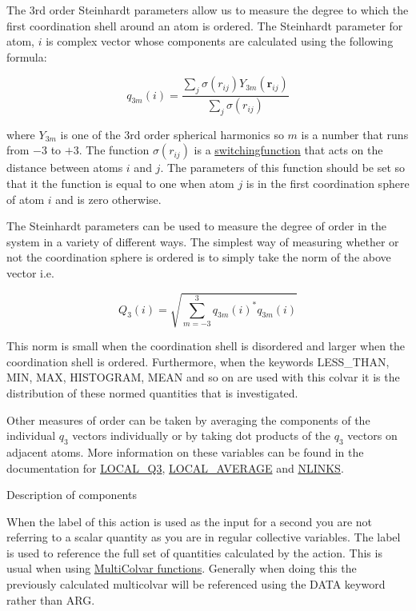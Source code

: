 The 3rd order Steinhardt parameters allow us to measure the degree to which the first coordination shell around an atom is ordered. The Steinhardt parameter for atom, $i$ is complex vector whose components are calculated using the following formula\+:

\[ q_{3m}(i) = \frac{\sum_j \sigma( r_{ij} ) Y_{3m}(\mathbf{r}_{ij}) }{\sum_j \sigma( r_{ij} ) } \]

where $Y_{3m}$ is one of the 3rd order spherical harmonics so $m$ is a number that runs from $-3$ to $+3$. The function $\sigma( r_{ij} )$ is a \hyperlink{switchingfunction}{switchingfunction} that acts on the distance between atoms $i$ and $j$. The parameters of this function should be set so that it the function is equal to one when atom $j$ is in the first coordination sphere of atom $i$ and is zero otherwise.

The Steinhardt parameters can be used to measure the degree of order in the system in a variety of different ways. The simplest way of measuring whether or not the coordination sphere is ordered is to simply take the norm of the above vector i.\+e.

\[ Q_3(i) = \sqrt{ \sum_{m=-3}^3 q_{3m}(i)^{*} q_{3m}(i) } \]

This norm is small when the coordination shell is disordered and larger when the coordination shell is ordered. Furthermore, when the keywords L\+E\+S\+S\+\_\+\+T\+H\+A\+N, M\+I\+N, M\+A\+X, H\+I\+S\+T\+O\+G\+R\+A\+M, M\+E\+A\+N and so on are used with this colvar it is the distribution of these normed quantities that is investigated.

Other measures of order can be taken by averaging the components of the individual $q_3$ vectors individually or by taking dot products of the $q_{3}$ vectors on adjacent atoms. More information on these variables can be found in the documentation for \hyperlink{LOCAL_Q3}{L\+O\+C\+A\+L\+\_\+\+Q3}, \hyperlink{LOCAL_AVERAGE}{L\+O\+C\+A\+L\+\_\+\+A\+V\+E\+R\+A\+G\+E} and \hyperlink{NLINKS}{N\+L\+I\+N\+K\+S}.

\begin{DoxyParagraph}{Description of components}

\end{DoxyParagraph}
When the label of this action is used as the input for a second you are not referring to a scalar quantity as you are in regular collective variables. The label is used to reference the full set of quantities calculated by the action. This is usual when using \hyperlink{mcolv_multicolvarfunction}{Multi\+Colvar functions}. Generally when doing this the previously calculated multicolvar will be referenced using the D\+A\+T\+A keyword rather than A\+R\+G.

